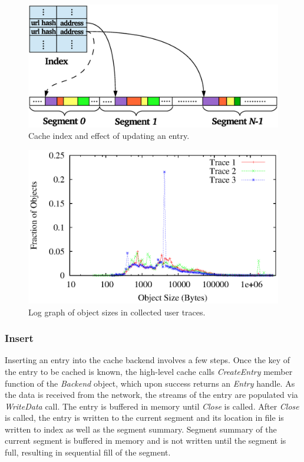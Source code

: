 \documentclass[letterpaper,twocolumn,10pt]{article}
\begin{document}
\begin{figure}[t]
  \begin{center}
    \includegraphics[width=0.9\columnwidth]{graphs/update}
  \end{center}
  \caption{Cache index and effect of updating an entry.}
  \label{fig:update} 
\end{figure}

\begin{figure}
  \begin{center}
    \includegraphics[width=\columnwidth]{graphs/log-size-dist}
  \end{center}
  \caption{Log graph of object sizes in collected user traces.}
  \label{fig:log-size-dist} 
\vspace{-0.2in}
\end{figure}


\subsubsection{Insert}
Inserting an entry into the cache backend involves a few steps.  Once the key of
the entry to be cached is known, the high-level cache calls \emph{CreateEntry}
member function of the \emph{Backend} object, which upon success returns an
\emph{Entry} handle.  As the data is received from the network, the streams of
the entry are populated via \emph{WriteData} call.  The entry is buffered in
memory until \emph{Close} is called.  After \emph{Close} is called, the entry is
written to the current segment and its location in file is written to index as
well as the segment summary.  Segment summary of the current segment is buffered
in memory and is not written until the segment is full, resulting in sequential
fill of the segment.
\end{document}

